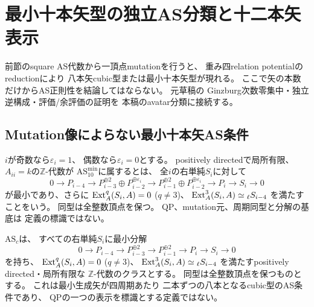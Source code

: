 \section{最小十本矢型の独立AS分類と十二本矢表示}
\label{sec:qa-as10-mutation-classification}

前節のsquare AS代数から一頂点mutationを行うと、
重み四relation potentialのreductionにより
八本矢cubic型または最小十本矢型が現れる。
ここで矢の本数だけからAS正則性を結論してはならない。
元草稿\cite[第VIII部，第X部]{AvatarVSeven2026}の
Ginzburg次数零集中・独立逆構成・評価/余評価の証明を
本稿のavatar分類に接続する。

\subsection{Mutation像によらない最小十本矢AS条件}
\label{subsec:qa-as10-minimal}

\begin{definition}[最小十本矢AS型]
\label{def:qa-as10-minimal}
$i$が奇数なら$\varepsilon_i=1$、
偶数なら$\varepsilon_i=0$とする。
positively directedで局所有限、
$A_{ii}=k$の$\mathbb Z$-代数が
$\mathrm{AS}_{10}^{\mathrm{min}}$に属するとは、
全$i$の右単純$S_i$に対して
\begin{equation}
0\to P_{i-4}\to
 P_{i-3}^{\oplus2}\oplus P_{i-2}^{\oplus\varepsilon_i}
 \to P_{i-1}^{\oplus2}\oplus P_{i-2}^{\oplus\varepsilon_i}
 \to P_i\to S_i\to0
\label{eq:qa-as10-minimal-resolution}
\end{equation}
が最小であり、さらに
$\operatorname{Ext}_A^q(S_i,A)=0$ ($q\ne3$)、
$\operatorname{Ext}_A^3(S_i,A)\simeq {}_\ell S_{i-4}$
を満たすことをいう。
同型は全整数頂点を保つ。
QP、mutation元、周期同型と分解の基底は
定義の標識ではない。
\end{definition}

\begin{definition}
\label{def:qa-as-cubic-minimal}
$\mathrm{AS}_{c}$は、
すべての右単純$S_i$に最小分解
\begin{equation}
0\to P_{i-4}\to P_{i-3}^{\oplus2}
 \to P_{i-1}^{\oplus2}\to P_i\to S_i\to0
\label{eq:qa-as-cubic-minimal-resolution}
\end{equation}
を持ち、
$\operatorname{Ext}_A^q(S_i,A)=0$ ($q\ne3$)、
$\operatorname{Ext}_A^3(S_i,A)\simeq {}_\ell S_{i-4}$
を満たすpositively directed・局所有限な
$\mathbb Z$-代数のクラスとする。
同型は全整数頂点を保つものとする。
これは最小生成矢が四周期あたり
二本ずつの八本となるcubic型のAS条件であり、
QPの一つの表示を標識とする定義ではない。
\end{definition}

